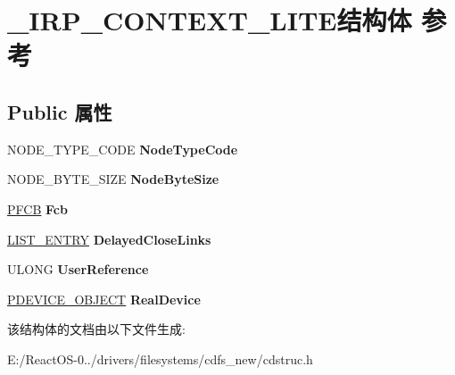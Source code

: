\hypertarget{struct___i_r_p___c_o_n_t_e_x_t___l_i_t_e}{}\section{\+\_\+\+I\+R\+P\+\_\+\+C\+O\+N\+T\+E\+X\+T\+\_\+\+L\+I\+T\+E结构体 参考}
\label{struct___i_r_p___c_o_n_t_e_x_t___l_i_t_e}
\subsection*{Public 属性}
\begin{DoxyCompactItemize}
\item 
\mbox{\label{struct___i_r_p___c_o_n_t_e_x_t___l_i_t_e_a08349dd6daada3fb97c0e8446dd0cdae}} 
N\+O\+D\+E\+\_\+\+T\+Y\+P\+E\+\_\+\+C\+O\+DE {\bfseries Node\+Type\+Code}
\item 
\mbox{\label{struct___i_r_p___c_o_n_t_e_x_t___l_i_t_e_ae3804e02591d3f8b28122af1f293168f}} 
N\+O\+D\+E\+\_\+\+B\+Y\+T\+E\+\_\+\+S\+I\+ZE {\bfseries Node\+Byte\+Size}
\item 
\mbox{\label{struct___i_r_p___c_o_n_t_e_x_t___l_i_t_e_a74ae6dcc4e550595e0057052d354677a}} 
\hyperlink{struct___f_c_b}{P\+F\+CB} {\bfseries Fcb}
\item 
\mbox{\label{struct___i_r_p___c_o_n_t_e_x_t___l_i_t_e_a305d11ab09b41f4555e05612259283ba}} 
\hyperlink{struct___l_i_s_t___e_n_t_r_y}{L\+I\+S\+T\+\_\+\+E\+N\+T\+RY} {\bfseries Delayed\+Close\+Links}
\item 
\mbox{\label{struct___i_r_p___c_o_n_t_e_x_t___l_i_t_e_aa81221182a99b82da0dc6783ce9ea674}} 
U\+L\+O\+NG {\bfseries User\+Reference}
\item 
\mbox{\label{struct___i_r_p___c_o_n_t_e_x_t___l_i_t_e_a36afe2a88cb8a32b3c5081fc0503003c}} 
\hyperlink{struct___d_e_v_i_c_e___o_b_j_e_c_t}{P\+D\+E\+V\+I\+C\+E\+\_\+\+O\+B\+J\+E\+CT} {\bfseries Real\+Device}
\end{DoxyCompactItemize}


该结构体的文档由以下文件生成\+:\begin{DoxyCompactItemize}
\item 
E\+:/\+React\+O\+S-\/0../drivers/filesystems/cdfs\+\_\+new/cdstruc.\+h\end{DoxyCompactItemize}
